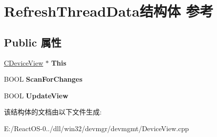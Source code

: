 \hypertarget{struct_refresh_thread_data}{}\section{Refresh\+Thread\+Data结构体 参考}
\label{struct_refresh_thread_data}
\subsection*{Public 属性}
\begin{DoxyCompactItemize}
\item 
\mbox{\label{struct_refresh_thread_data_aa00326387879c6357070c0616de56868}} 
\hyperlink{class_c_device_view}{C\+Device\+View} $\ast$ {\bfseries This}
\item 
\mbox{\label{struct_refresh_thread_data_a707dc85c7e8c322ba8a23e5dfb266c6c}} 
B\+O\+OL {\bfseries Scan\+For\+Changes}
\item 
\mbox{\label{struct_refresh_thread_data_a1f78702fe1184674166956a7a8df484e}} 
B\+O\+OL {\bfseries Update\+View}
\end{DoxyCompactItemize}


该结构体的文档由以下文件生成\+:\begin{DoxyCompactItemize}
\item 
E\+:/\+React\+O\+S-\/0../dll/win32/devmgr/devmgmt/Device\+View.\+cpp\end{DoxyCompactItemize}
